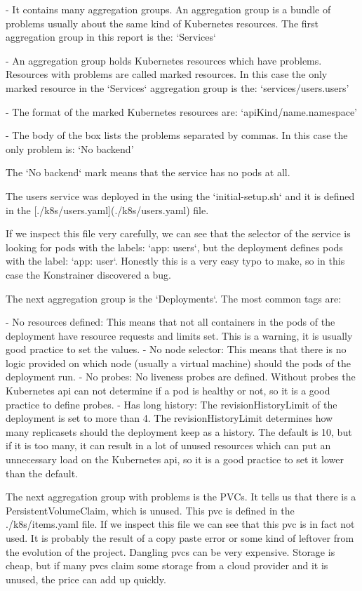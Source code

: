 - It contains many aggregation groups. An aggregation group is a bundle of problems usually about the same kind of Kubernetes resources. The first aggregation group in this report is the: `Services`

  - An aggregation group holds Kubernetes resources which have problems. Resources with problems are called marked resources. In this case the only marked resource in the `Services` aggregation group is the: `services/users.users'

  - The format of the marked Kubernetes resources are: `apiKind/name.namespace'

  - The body of the box lists the problems separated by commas. In this case the only problem is: `No backend'

The `No backend` mark means that the service has no pods at all.

The users service was deployed in the using the `initial-setup.sh` and it is defined in the [./k8s/users.yaml](./k8s/users.yaml) file.

If we inspect this file very carefully, we can see that the selector of the service is looking for pods with the labels: `app: users`, but the deployment defines pods with the label: `app: user`. Honestly this is a very easy typo to make, so in this case the Konstrainer discovered a bug.

The next aggregation group is the `Deployments`. The most common tags are:

- No resources defined: This means that not all containers in the pods of the deployment have resource requests and limits set. This is a warning, it is usually  good practice to set the values.
- No node selector: This means that there is no logic provided on which node (usually a virtual machine) should the pods of the deployment run.
- No probes: No liveness probes are defined. Without probes the Kubernetes api can not determine if a pod is healthy or not, so it is a good practice to define probes.
- Has long history: The revisionHistoryLimit of the deployment is set to more than 4. The revisionHistoryLimit determines how many replicasets should the deployment keep as a history. The default is 10, but if it is too many, it can result in a lot of unused resources which can put an unnecessary load on the Kubernetes api, so it is a good practice to set it lower than the default.

The next aggregation group with problems is the PVCs. It tells us that there is a PersistentVolumeClaim, which is unused. This pvc is defined in the ./k8s/items.yaml file. If we inspect this file we can see that this pvc is in fact not used. It is probably the result of a copy paste error or some kind of leftover from the evolution of the project. Dangling pvcs can be very expensive. Storage is cheap, but if many pvcs claim some storage from a cloud provider and it is unused, the price can add up quickly.

